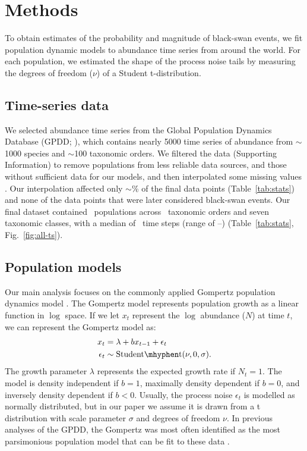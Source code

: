 \section{Methods}

To obtain estimates of the probability and magnitude of black-swan events, we
fit population dynamic models to abundance time series from around the world.
For each population, we estimated the shape of the process noise tails by
measuring the degrees of freedom ($\nu$) of a Student t-distribution.

\subsection{Time-series data}

We selected abundance time series from the Global Population Dynamics Database
(GPDD; \citeauthor{gpdd2010} \citeyear{gpdd2010}), which contains nearly 5000
time series of abundance from $\sim$1000 species and $\sim$100 taxonomic
orders. We filtered the data (Supporting Information) to remove populations
from less reliable data sources, and those without sufficient data for our
models, and then interpolated some missing values
\citep[\textit{sensu}][]{brook2006a}. Our interpolation affected only
$\sim$\interpPointsPerc \% of the final data points (Table~\ref{tab:stats})
and none of the data points that were later considered black-swan events. Our
final dataset contained \NPops~populations across \NOrders~taxonomic orders
and seven taxonomic classes, with a median of \medianTimeSteps~time steps
(range of \minTimeSteps--\maxTimeSteps) (Table~\ref{tab:stats},
Fig.~\ref{fig:all-ts}).

\subsection{Population models}

Our main analysis focuses on the commonly applied Gompertz population dynamics
model \citep[e.g.][]{knape2012,dennis2014,connors2014}. The Gompertz model
represents population growth as a linear function in $\log$ space. If we let
$x_t$ represent the $\log$ abundance ($N$) at time $t$, we can represent the
Gompertz model as:
\begin{align*}
x_t &= \lambda + b x_{t-1} + \epsilon_t\\
\epsilon_t &\sim \mathrm{Student\mhyphen t}(\nu, 0, \sigma).
\end{align*}
The growth parameter $\lambda$ represents the expected growth rate if $N_t =
1$. The model is density independent if $b = 1$, maximally density dependent if
$b = 0$, and inversely density dependent if $b < 0$. Usually, the process noise
$\epsilon_t$ is modelled as normally distributed, but in our paper we assume it
is drawn from a t distribution with scale parameter $\sigma$ and degrees of
freedom $\nu$. In previous analyses of the GPDD, the Gompertz was most often
identified as the most parsimonious population model that can be fit to these
data \citep{brook2006}.

